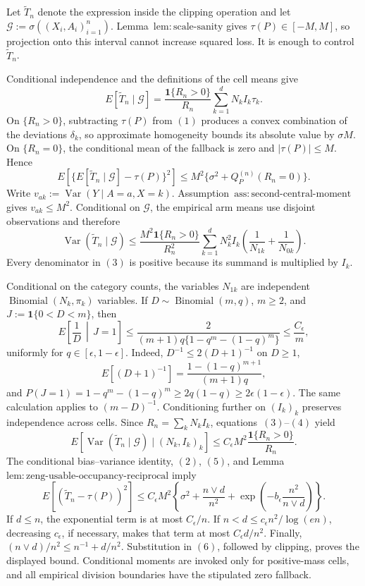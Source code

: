 Let \(\widetilde T_n\) denote the expression inside the clipping operation and let \(\mathcal G:=\sigma((X_i,A_i)_{i=1}^n)\).  Lemma~\(\mathrm{lem:scale\text{-}sanity}\) gives \(\tau(P)\in[-M,M]\), so projection onto this interval cannot increase squared loss.  It is enough to control \(\widetilde T_n\).

Conditional independence and the definitions of the cell means give
\[
 E[\widetilde T_n\mid\mathcal G]
 =\frac{\mathbf 1\{R_n>0\}}{R_n}\sum_{k=1}^dN_kI_k\tau_k.
\tag{1}
\]
On \(\{R_n>0\}\), subtracting \(\tau(P)\) from \((1)\) produces a convex combination of the deviations \(\delta_k\), so approximate homogeneity bounds its absolute value by \(\sigma M\).  On \(\{R_n=0\}\), the conditional mean of the fallback is zero and \(|\tau(P)|\le M\).  Hence
\[
 E\!\left[\{E[\widetilde T_n\mid\mathcal G]-\tau(P)\}^2\right]
 \le M^2\{\sigma^2+Q_P^{(n)}(R_n=0)\}.
\tag{2}
\]
Write \(v_{ak}:=\operatorname{Var}(Y\mid A=a,X=k)\).  Assumption~\(\mathrm{ass:second\text{-}central\text{-}moment}\) gives \(v_{ak}\le M^2\).  Conditional on \(\mathcal G\), the empirical arm means use disjoint observations and therefore
\[
 \operatorname{Var}(\widetilde T_n\mid\mathcal G)
 \le \frac{M^2\mathbf 1\{R_n>0\}}{R_n^2}
 \sum_{k=1}^dN_k^2I_k\left(\frac1{N_{1k}}+\frac1{N_{0k}}\right).
\tag{3}
\]
Every denominator in \((3)\) is positive because its summand is multiplied by \(I_k\).

Conditional on the category counts, the variables \(N_{1k}\) are independent \(\operatorname{Binomial}(N_k,\pi_k)\) variables.  If \(D\sim\operatorname{Binomial}(m,q)\), \(m\ge2\), and \(J:=\mathbf 1\{0<D<m\}\), then
\[
 E\left[\frac1D\,\middle|\,J=1\right]
 \le \frac{2}{(m+1)q\{1-q^m-(1-q)^m\}}
 \le \frac{C_{\epsilon}}m,
\tag{4}
\]
uniformly for \(q\in[\epsilon,1-\epsilon]\).  Indeed, \(D^{-1}\le2(D+1)^{-1}\) on \(D\ge1\),
\[
 E[(D+1)^{-1}]=\frac{1-(1-q)^{m+1}}{(m+1)q},
\]
and \(P(J=1)=1-q^m-(1-q)^m\ge2q(1-q)\ge2\epsilon(1-\epsilon)\).  The same calculation applies to \((m-D)^{-1}\).  Conditioning further on \((I_k)_k\) preserves independence across cells.  Since \(R_n=\sum_kN_kI_k\), equations~\((3)\)--\((4)\) yield
\[
 E[\operatorname{Var}(\widetilde T_n\mid\mathcal G)\mid(N_k,I_k)_k]
 \le C_{\epsilon}M^2\frac{\mathbf 1\{R_n>0\}}{R_n}.
\tag{5}
\]
The conditional bias--variance identity, \((2)\), \((5)\), and Lemma~\(\mathrm{lem:zeng\text{-}usable\text{-}occupancy\text{-}reciprocal}\) imply
\[
 E[(\widetilde T_n-\tau(P))^2]
 \le C_{\epsilon}M^2\left\{\sigma^2+\frac{n\vee d}{n^2}
 +\exp\left(-b_{\epsilon}\frac{n^2}{n\vee d}\right)\right\}.
\tag{6}
\]
If \(d\le n\), the exponential term is at most \(C_{\epsilon}/n\).  If \(n<d\le c_{\epsilon}n^2/\log(en)\), decreasing \(c_{\epsilon}\), if necessary, makes that term at most \(C_{\epsilon}d/n^2\).  Finally, \((n\vee d)/n^2\le n^{-1}+d/n^2\).  Substitution in \((6)\), followed by clipping, proves the displayed bound.  Conditional moments are invoked only for positive-mass cells, and all empirical division boundaries have the stipulated zero fallback.